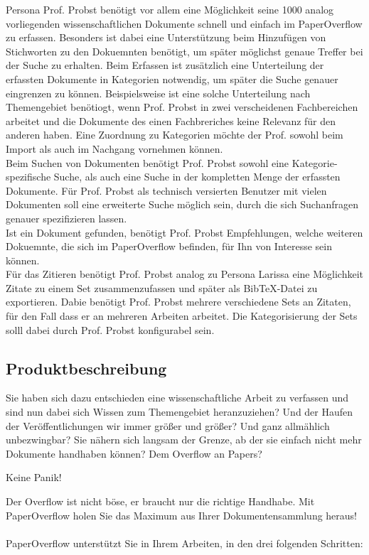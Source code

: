 \documentclass[a4paper,12pt]{article}
\begin{document}
Persona Prof. Probst benötigt vor allem eine Möglichkeit seine 1000 analog vorliegenden wissenschaftlichen Dokumente schnell und einfach im PaperOverflow zu erfassen. Besonders ist dabei eine Unterstützung beim Hinzufügen von Stichworten zu den Dokuemnten benötigt, um später möglichst genaue Treffer bei der Suche zu erhalten. Beim Erfassen ist zusätzlich eine Unterteilung der erfassten Dokumente in Kategorien notwendig, um später die Suche genauer eingrenzen zu können. Beispielsweise ist eine solche Unterteilung nach Themengebiet benötiogt, wenn Prof. Probst in zwei verscheidenen Fachbereichen arbeitet und die Dokumente des einen Fachbreriches keine Relevanz für den anderen haben. Eine Zuordnung zu Kategorien möchte der Prof. sowohl beim Import als auch im Nachgang vornehmen können. \\
Beim Suchen von Dokumenten benötigt Prof. Probst sowohl eine Kategorie-spezifische Suche, als auch eine Suche in der kompletten Menge der erfassten Dokumente. Für Prof. Probst als technisch versierten Benutzer mit vielen Dokumenten soll eine erweiterte Suche möglich sein, durch die sich Suchanfragen genauer spezifizieren lassen.\\
Ist ein Dokument gefunden, benötigt Prof. Probst Empfehlungen, welche weiteren Dokuemnte, die sich im PaperOverflow befinden, für Ihn von Interesse sein können.\\
Für das Zitieren benötigt Prof. Probst analog zu Persona Larissa eine Möglichkeit Zitate zu einem Set zusammenzufassen und später als BibTeX-Datei zu exportieren. Dabie benötigt Prof. Probst mehrere verschiedene Sets an Zitaten, für den Fall dass er an mehreren Arbeiten arbeitet. Die Kategorisierung der Sets solll dabei durch Prof. Probst konfigurabel sein.

\subsection{Produktbeschreibung}

Sie haben sich dazu entschieden eine wissenschaftliche Arbeit zu verfassen und sind nun dabei sich Wissen zum Themengebiet heranzuziehen? Und der Haufen der Veröffentlichungen wir immer größer und größer? Und ganz allmählich unbezwingbar? Sie nähern sich langsam der Grenze, ab der sie einfach nicht mehr Dokumente handhaben können? Dem Overflow an Papers? 
\begin{center}
Keine Panik! 
\end{center}
Der Overflow ist nicht böse, er braucht nur die richtige Handhabe. Mit PaperOverflow holen Sie das Maximum aus Ihrer Dokumentensammlung heraus!\\ \\
PaperOverflow unterstützt Sie in Ihrem Arbeiten, in den drei folgenden Schritten:
\end{document}
